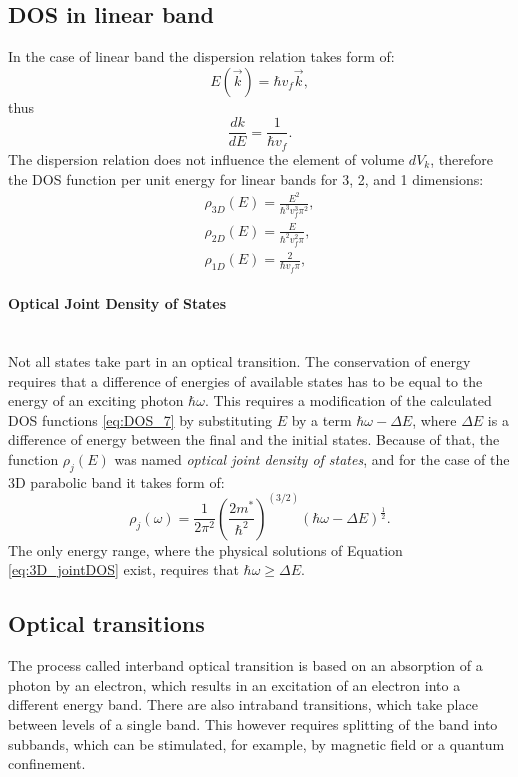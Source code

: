 \documentclass[titlepage,a4paper]{book}
\newcommand{\wciecie}{\quad\phantom{v}}
\newcommand{\myparagraph}[1]{\paragraph{#1}\mbox{}\\}
\begin{document}
\subsection{DOS in linear band}
\wciecie
In the case of linear band the dispersion relation takes form of:
\begin{equation}
\label{eq:DOS_lin1}
E(\vec{k}) = \hbar v_f \vec{k},
\end{equation}
thus
\begin{equation}
\label{eq:DOS_lin2}
\frac{dk}{dE} = \frac{1}{\hbar v_f}.
\end{equation}
The dispersion relation does not influence the element of volume $dV_k$, therefore the DOS function per unit energy for linear bands for 3, 2, and 1 dimensions:
\begin{eqnarray}
\label{eq:DOS_lin4}
\rho_{3D}(E) = \frac{E^2}{\hbar^3 v_f^3 \pi^2}, \\
\rho_{2D}(E) = \frac{E}{\hbar^2 v_f^2 \pi},\\
\rho_{1D}(E) = \frac{2}{\hbar v_f \pi},
\end{eqnarray}

\myparagraph{Optical Joint Density of States}
\wciecie
Not all states take part in an optical transition. The conservation of energy requires that a difference of energies of available states has to be equal to the energy of an exciting photon $\hbar\omega$. This requires a modification of the calculated DOS functions \ref{eq:DOS_7} by substituting $E$ by a term $\hbar\omega-\Delta E$, where $\Delta E$ is a difference of energy between the final and the initial states. Because of that, the function $\rho_j (E)$ was named \textit{optical joint density of states}, and for the case of the 3D parabolic band it takes form of:
\begin{equation}
\label{eq:3D_jointDOS}
\rho_j (\omega) = \frac{1}{2\pi^2} \left(\frac{2m^*}{\hbar^2} \right)^{(3/2)} (\hbar\omega-\Delta E)^{\frac{1}{2}}.
\end{equation}
The only energy range, where the physical solutions of Equation \ref{eq:3D_jointDOS} exist, requires that $\hbar\omega \geq \Delta E$.

\subsection{Optical transitions}
\wciecie
The process called interband optical transition is based on an absorption of a photon by an electron, which results in an excitation of an electron into a different energy band. There are also intraband transitions, which take place between levels of a single band. This however requires splitting of the band into subbands, which can be stimulated, for example, by magnetic field or a quantum confinement.
\end{document}
